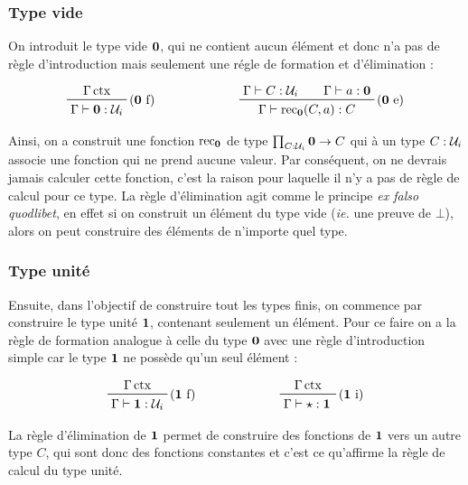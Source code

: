 \documentclass[../../rapport.tex]{subfiles}
\begin{document}
  \subsubsection{Type vide}

  On introduit le type vide $\operatorname{\textbf{0}}$, qui ne contient aucun élément et donc n'a pas de règle d'introduction mais seulement
  une régle de formation et d'élimination :

  $$
  \prfinterspace=2em
  \begin{array}{cc}
    \prftree[r]{($\0$ f)}{\Gamma \ctx}{\Gamma \vdash \0 : \U_i} \hspace{2cm}
    & \prftree[r]{($\0$ e)}{\Gamma \vdash C : \U_i}{\Gamma \vdash a : \0}{\Gamma \vdash \rec_{\0}(C, a) : C}
  \end{array}
  $$

  Ainsi, on a construit une fonction $\operatorname{rec}_{\operatorname{\textbf{0}}}$ de type $\prod_{C: \mathcal U_i} \operatorname{\textbf{0}} \rightarrow C$
  qui à un type $C : \mathcal U_i$ associe une fonction qui ne prend aucune valeur.
  Par conséquent, on ne devrais jamais calculer cette fonction,
  c'est la raison pour laquelle il n'y a pas de règle de calcul pour ce type.
  La règle d'élimination agit comme le principe \textit{ex falso quodlibet},
  en effet si on construit un élément du type vide (\textit{ie.} une preuve de $\bot$),
  alors on peut construire des éléments de n'importe quel type.

  \subsubsection{Type unité}

  Ensuite, dans l'objectif de construire tout les types finis, on commence par construire le type unité $\operatorname{\textbf{1}}$,
  contenant seulement un élément. Pour ce faire on a la règle de formation analogue à celle du type $\operatorname{\textbf{0}}$ avec
  une règle d'introduction simple car le type $\operatorname{\textbf{1}}$ ne possède qu'un seul élément :

  $$
  \prfinterspace=2em
  \begin{array}{cc}
    \prftree[r]{($\1$ f)}{\Gamma \ctx}{\Gamma \vdash \1 : \U_i} \hspace{2cm}
    & \prftree[r]{($\1$ i)}{\Gamma \ctx}{\Gamma \vdash \star : \1}
  \end{array}
  $$

  La règle d'élimination de $\operatorname{\textbf{1}}$ permet de construire des fonctions de $\operatorname{\textbf{1}}$ vers un autre type $C$,
  qui sont donc des fonctions constantes et c'est ce qu'affirme la règle de calcul du type unité.
\end{document}
